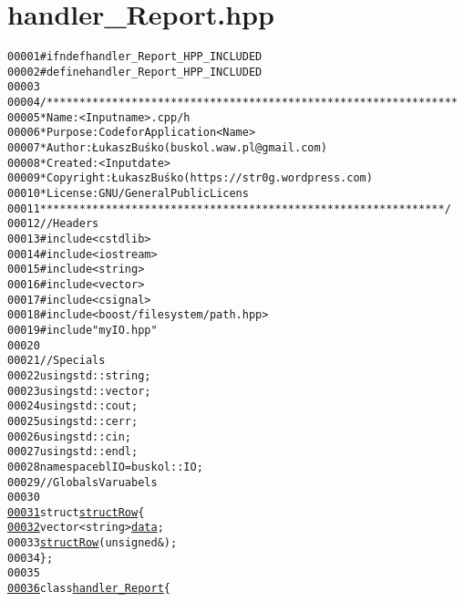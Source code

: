 \hypertarget{handler__Report_8hpp_source}{
\section{handler\_\-Report.hpp}
}


\begin{footnotesize}\begin{alltt}
00001 \textcolor{preprocessor}{#ifndef handler\_Report\_HPP\_INCLUDED}
00002 \textcolor{preprocessor}{}\textcolor{preprocessor}{#define handler\_Report\_HPP\_INCLUDED}
00003 \textcolor{preprocessor}{}
00004 \textcolor{comment}{/***************************************************************}
00005 \textcolor{comment}{ * Name:      <Input name>.cpp/h}
00006 \textcolor{comment}{ * Purpose:   Code for Application <Name>}
00007 \textcolor{comment}{ * Author:    Łukasz Buśko (buskol.waw.pl@gmail.com)}
00008 \textcolor{comment}{ * Created:   <Input date>}
00009 \textcolor{comment}{ * Copyright: Łukasz Buśko (https://str0g.wordpress.com)}
00010 \textcolor{comment}{ * License:   GNU / General Public Licens}
00011 \textcolor{comment}{ **************************************************************/}
00012 \textcolor{comment}{//Headers}
00013 \textcolor{preprocessor}{#include <cstdlib>}
00014 \textcolor{preprocessor}{#include <iostream>}
00015 \textcolor{preprocessor}{#include <string>}
00016 \textcolor{preprocessor}{#include <vector>}
00017 \textcolor{preprocessor}{#include <csignal>}
00018 \textcolor{preprocessor}{#include <boost/filesystem/path.hpp>}
00019 \textcolor{preprocessor}{#include "myIO.hpp"}
00020 
00021 \textcolor{comment}{//Specials}
00022 \textcolor{keyword}{using} std::string;
00023 \textcolor{keyword}{using} std::vector;
00024 \textcolor{keyword}{using} std::cout;
00025 \textcolor{keyword}{using} std::cerr;
00026 \textcolor{keyword}{using} std::cin;
00027 \textcolor{keyword}{using} std::endl;
00028 \textcolor{keyword}{namespace }blIO = buskol::IO;
00029 \textcolor{comment}{//Globals Varuabels}
00030 
\hypertarget{handler__Report_8hpp_source_l00031}{}\hyperlink{structstructRow}{00031} \textcolor{keyword}{struct }\hyperlink{structstructRow}{structRow}\{
\hypertarget{handler__Report_8hpp_source_l00032}{}\hyperlink{structstructRow_a627f7dc245b2dd29b2c94e02f5347573}{00032}     vector<string> \hyperlink{structstructRow_a627f7dc245b2dd29b2c94e02f5347573}{data}; 
00033     \hyperlink{structstructRow_a09213fb7bb170a682869db469718761e}{structRow}(\textcolor{keywordtype}{unsigned} &);
00034 \};
00035 
\hypertarget{handler__Report_8hpp_source_l00036}{}\hyperlink{classhandler__Report}{00036} \textcolor{keyword}{class }\hyperlink{classhandler__Report}{handler_Report}\{

\end{alltt}
\end{footnotesize}
